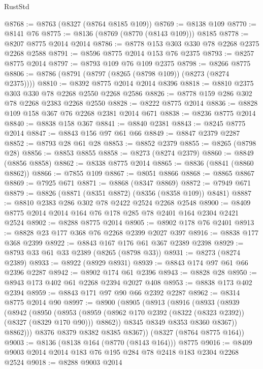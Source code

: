 \begin{lexlean}{RustStd}
\begin{coremodule}
@8768 := @8763 (@8327 (@8764 @8185 @109))
@8769 := @8138 @109
@8770 := @8141 @76
@8775 := @8136 (@8769 (@8770 (@8143 @109))) @8185
@8778 := @8207 @8775 @2014 @2014
@8786 := @8778 @153 @303 @330 @78 @2268 @2375 @2268 @2588
@8791 := @8596 @8775 @2014 @153 @76 @2375
@8793 := @8257 @8775 @2014
@8797 := @8793 @109 @76 @109 @2375
@8798 := @8266 @8775
@8806 := @8786 (@8791 (@8797 (@8265 (@8798 @109)) (@8273 (@8274 @2375))))
@8810 := @8392 @8775 @2014 @2014 @8396
@8818 := @8810 @2375 @303 @330 @78 @2268 @2550 @2268 @2586
@8826 := @8778 @159 @286 @302 @78 @2268 @2383 @2268 @2550
@8828 := @8222 @8775 @2014
@8836 := @8828 @109 @158 @367 @76 @2268 @2381 @2014 @671
@8838 := @8236 @8775 @2014
@8840 := @8838 @158 @367
@8841 := @8840 @2381
@8843 := @8245 @8775 @2014
@8847 := @8843 @156 @97 @61 @66
@8849 := @8847 @2379 @2287
@8852 := @8793 @28 @61 @28
@8853 := @8852 @2379
@8855 := @8265 (@8798 @28)
@8856 := @8853 @8855
@8858 := @8273 (@8274 @2379)
@8860 := @8849 (@8856 @8858)
@8862 := @8338 @8775 @2014
@8865 := @8836 (@8841 (@8860 @8862))
@8866 := @7855 @109
@8867 := @8051 @8866
@8868 := @8865 @8867
@8869 := @7925 @671
@8871 := @8868 (@8347 @8869)
@8872 := @7949 @671
@8879 := @8826 (@8871 (@8351 @8872) (@8356 (@8358 @109)) @8481)
@8887 := @8810 @2383 @286 @302 @78 @2422 @2524 @2268 @2548
@8900 := @8409 @8775 @2014 @2014 @164 @76 @178 @285 @78 @2401 @164 @2304 @2421 @2524
@8902 := @8288 @8775 @2014
@8905 := @8902 @178 @76 @2401
@8913 := @8828 @23 @177 @368 @76 @2268 @2399 @2027 @397
@8916 := @8838 @177 @368 @2399
@8922 := @8843 @167 @176 @61 @367 @2389 @2398
@8929 := @8793 @33 @61 @33 @2389 (@8265 (@8798 @33))
@8931 := @8273 (@8274 @2389)
@8933 := @8922 (@8929 @8931)
@8939 := @8843 @174 @97 @61 @66 @2396 @2287
@8942 := @8902 @174 @61 @2396
@8943 := @8828 @28
@8950 := @8943 @173 @402 @61 @2268 @2394 @2027 @408
@8953 := @8838 @173 @402 @2394
@8959 := @8843 @171 @97 @90 @66 @2392 @2287
@8962 := @8314 @8775 @2014 @90
@8997 := @8900
    (@8905
      (@8913
        (@8916
          (@8933
            (@8939
              (@8942
                (@8950
                  (@8953
                    (@8959 (@8962 @170 @2392 (@8322 (@8323 @2392)) (@8327 (@8329 @170 @90))) @8862))
                  @8345
                  @8349
                  @8353
                  @8360
                  @8367))
              @8862)))
        @8376
        @8379
        @8382
        @8385
        @8367))
    (@8327 (@8764 @8775 @164))
@9003 := @8136 (@8138 @164 (@8770 (@8143 @164))) @8775
@9016 := @8409 @9003 @2014 @2014 @183 @76 @195 @284 @78 @2418 @183 @2304 @2268 @2524
@9018 := @8288 @9003 @2014

\end{coremodule}
\end{lexlean}
